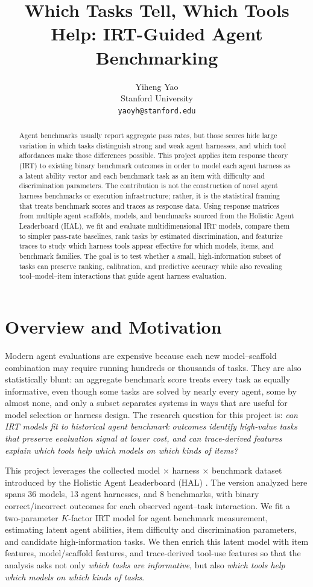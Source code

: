 \documentclass{article}
\title{Which Tasks Tell, Which Tools Help: IRT-Guided Agent Benchmarking}
\author{%
  Yiheng Yao\\
  Stanford University\\
  \texttt{yaoyh@stanford.edu}\\
}
\begin{document}
\maketitle

\begin{abstract}
Agent benchmarks usually report aggregate pass rates, but those scores hide large variation in which tasks distinguish strong and weak agent harnesses, and which tool affordances make those differences possible. This project applies item response theory (IRT) to existing binary benchmark outcomes in order to model each agent harness as a latent ability vector and each benchmark task as an item with difficulty and discrimination parameters. The contribution is not the construction of novel agent harness benchmarks or execution infrastructure; rather, it is the statistical framing that treats benchmark scores and traces as response data. Using response matrices from multiple agent scaffolds, models, and benchmarks sourced from the Holistic Agent Leaderboard (HAL), we fit and evaluate multidimensional IRT models, compare them to simpler pass-rate baselines, rank tasks by estimated discrimination, and featurize traces to study which harness tools appear effective for which models, items, and benchmark families. The goal is to test whether a small, high-information subset of tasks can preserve ranking, calibration, and predictive accuracy while also revealing tool--model--item interactions that guide agent harness evaluation.
\end{abstract}

\section{Overview and Motivation}

Modern agent evaluations are expensive because each new model--scaffold combination may require running hundreds or thousands of tasks. They are also statistically blunt: an aggregate benchmark score treats every task as equally informative, even though some tasks are solved by nearly every agent, some by almost none, and only a subset separates systems in ways that are useful for model selection or harness design. The research question for this project is: \emph{can IRT models fit to historical agent benchmark outcomes identify high-value tasks that preserve evaluation signal at lower cost, and can trace-derived features explain which tools help which models on which kinds of items?}

This project leverages the collected model $\times$ harness $\times$ benchmark dataset introduced by the Holistic Agent Leaderboard (HAL) \citep{hal2026}. The version analyzed here spans 36 models, 13 agent harnesses, and 8 benchmarks, with binary correct/incorrect outcomes for each observed agent--task interaction. We fit a two-parameter $K$-factor IRT model for agent benchmark measurement, estimating latent agent abilities, item difficulty and discrimination parameters, and candidate high-information tasks. We then enrich this latent model with item features, model/scaffold features, and trace-derived tool-use features so that the analysis asks not only \emph{which tasks are informative}, but also \emph{which tools help which models on which kinds of tasks}.
\end{document}
